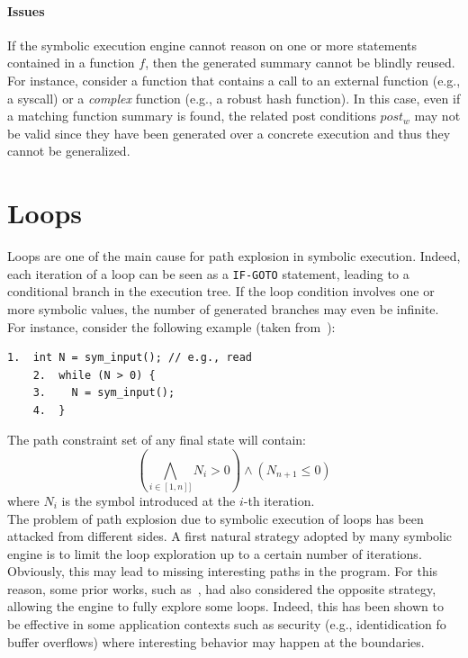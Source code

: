 \paragraph{Issues} If the symbolic execution engine cannot reason on one or more statements contained in a function $f$, then the generated summary cannot be blindly reused. For instance, consider a function that contains a call to an external function (e.g., a syscall) or a {\em complex} function (e.g., a robust hash function). In this case, even if a matching function summary is found, the related post conditions $post_w$ may not be valid since they have been generated over a concrete execution and thus they cannot be generalized.




\section{Loops}
\label{se:loops}

Loops are one of the main cause for path explosion in symbolic execution. Indeed, each iteration of a loop can be seen as a {\tt IF-GOTO} statement, leading to a conditional branch in the execution tree. If the loop condition involves one or more symbolic values, the number of generated branches may even be infinite. For instance, consider the following example (taken from~\cite{CS-CACM13}):
    \begin{lstlisting}[basicstyle=\ttfamily\small]
    1.  int N = sym_input(); // e.g., read
    2.  while (N > 0) {
    3.    N = sym_input();  
    4.  }
    \end{lstlisting}
The path constraint set of any final state will contain:
  \[ \left ( \bigwedge_{i \in [1, n]]} N_i > 0 \right ) \wedge (N_{n+1} \leq 0) \]
where $N_i$ is the symbol introduced at the $i$-th iteration.\\

The problem of path explosion due to symbolic execution of loops has been attacked from different sides. A first natural strategy adopted by many symbolic engine is to limit the loop exploration up to a certain number of iterations. Obviously, this may lead to missing interesting paths in the program. For this reason, some prior works, such as~\cite{AEG-NDSS11}, had also considered the opposite strategy, allowing the engine to fully explore some loops. Indeed, this has been shown to be effective in some application contexts such as security (e.g., identidication fo buffer overflows) where interesting behavior may happen at the boundaries.

